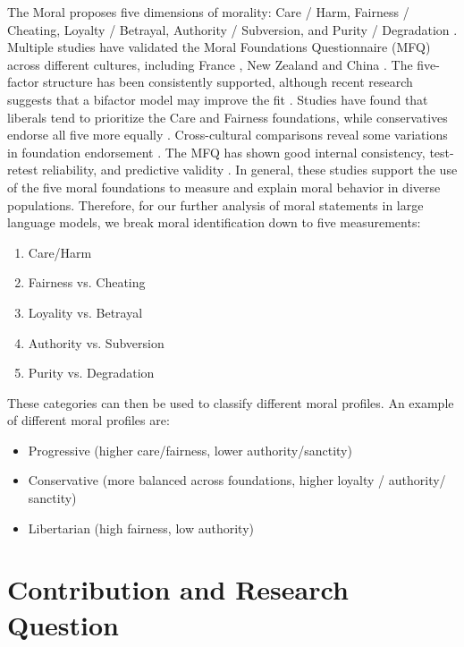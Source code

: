 \documentclass[runninghheads]{llncs}
\begin{document}
The Moral proposes five dimensions of morality: Care / Harm, Fairness / Cheating, Loyalty / Betrayal, Authority / Subversion, and Purity / Degradation \cite{Graham2011Mapping}. Multiple studies have validated the Moral Foundations Questionnaire (MFQ) across different cultures, including France \cite{S2014Validation}, New Zealand \cite{Davies2014Confirmatory} and China \cite{Du2019Validation}. The five-factor structure has been consistently supported, although recent research suggests that a bifactor model may improve the fit \cite{Wormley2023Measuring}. Studies have found that liberals tend to prioritize the Care and Fairness foundations, while conservatives endorse all five more equally \cite{Graham2009Liberals}. Cross-cultural comparisons reveal some variations in foundation endorsement 
\cite{alqahtani2020MORAL,Du2019Validation}. The MFQ has shown good internal consistency, test-retest reliability, and predictive validity \cite{S2014Validation}. In general, these studies support the use of the five moral foundations to measure and explain moral behavior in diverse populations. Therefore, for our further analysis of moral statements in large language models, we break moral identification down to five measurements: 
\begin{enumerate}
    \item Care/Harm
    \item Fairness vs. Cheating
    \item Loyality vs. Betrayal
    \item Authority vs. Subversion
    \item Purity vs. Degradation
\end{enumerate}

These categories can then be used to classify different moral profiles. An example of different moral profiles are: 
\begin{itemize}
    \item Progressive (higher care/fairness, lower authority/sanctity)
    \item Conservative (more balanced across foundations, higher loyalty / authority/ sanctity)
    \item Libertarian (high fairness, low authority)
\end{itemize}



\section{Contribution and Research Question}
\end{document}
